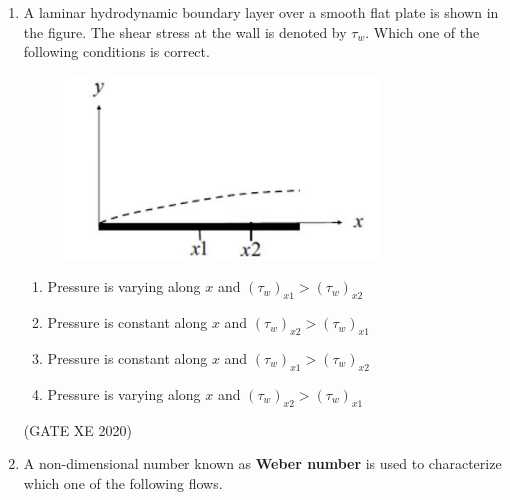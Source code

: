 \documentclass[12pt]{article}
\begin{document}
\begin{enumerate}
Two statements `P' and `Q' are given below:  

P: For a fully submerged condition, CG should always be below CB. \\  
Q: For a floating body, CG need not be below CB. \\  

Choose the option that is valid for the present situation.  

\begin{enumerate}
\item P is False; Q is True when metacentre is below CG  
\item P is False; Q is True when metacentre is above CG  
\item P is True; Q is True when metacentre is below CG  
\item P is True; Q is True when metacentre is above CG  
\end{enumerate}
(GATE XE 2020)

\item A laminar hydrodynamic boundary layer over a smooth flat plate is shown in the figure. The shear stress at the wall is denoted by $\tau_w$. Which one of the following conditions is correct.  

\begin{figure}[H]
    \centering
    \includegraphics[width=0.5\columnwidth]{figs/ass4_b_q4.png}
    \caption{}
    \label{fig:placeholder}
\end{figure}

\begin{enumerate}
\item Pressure is varying along $x$ and $(\tau_w)_{x1} > (\tau_w)_{x2}$  
\item Pressure is constant along $x$ and $(\tau_w)_{x2} > (\tau_w)_{x1}$  
\item Pressure is constant along $x$ and $(\tau_w)_{x1} > (\tau_w)_{x2}$  
\item Pressure is varying along $x$ and $(\tau_w)_{x2} > (\tau_w)_{x1}$  
\end{enumerate}
(GATE XE 2020)

\item A non-dimensional number known as \textbf{Weber number} is used to characterize which one of the following flows.  



\end{enumerate}
\end{document}
